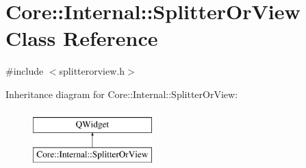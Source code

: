 \hypertarget{class_core_1_1_internal_1_1_splitter_or_view}{\section{Core\-:\-:Internal\-:\-:Splitter\-Or\-View Class Reference}
\label{class_core_1_1_internal_1_1_splitter_or_view}
}


{\ttfamily \#include $<$splitterorview.\-h$>$}

Inheritance diagram for Core\-:\-:Internal\-:\-:Splitter\-Or\-View\-:\begin{figure}[H]
\begin{center}
\leavevmode
\includegraphics[height=2.000000cm]{class_core_1_1_internal_1_1_splitter_or_view}
\end{center}
\end{figure}

